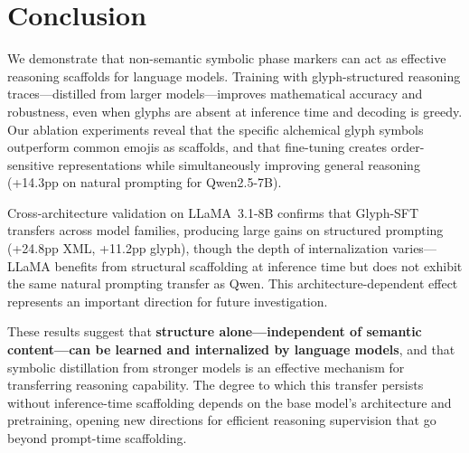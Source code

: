 \documentclass[11pt]{article}
\begin{document}
\section{Conclusion}

We demonstrate that non-semantic symbolic phase markers can act as effective reasoning scaffolds for language models. Training with glyph-structured reasoning traces---distilled from larger models---improves mathematical accuracy and robustness, even when glyphs are absent at inference time and decoding is greedy. Our ablation experiments reveal that the specific alchemical glyph symbols outperform common emojis as scaffolds, and that fine-tuning creates order-sensitive representations while simultaneously improving general reasoning (+14.3pp on natural prompting for Qwen2.5-7B).

Cross-architecture validation on LLaMA~3.1-8B confirms that Glyph-SFT transfers across model families, producing large gains on structured prompting (+24.8pp XML, +11.2pp glyph), though the depth of internalization varies---LLaMA benefits from structural scaffolding at inference time but does not exhibit the same natural prompting transfer as Qwen. This architecture-dependent effect represents an important direction for future investigation.

These results suggest that \textbf{structure alone---independent of semantic content---can be learned and internalized by language models}, and that symbolic distillation from stronger models is an effective mechanism for transferring reasoning capability. The degree to which this transfer persists without inference-time scaffolding depends on the base model's architecture and pretraining, opening new directions for efficient reasoning supervision that go beyond prompt-time scaffolding.



\end{document}

